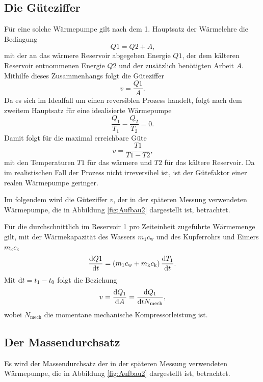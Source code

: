 \subsection{Die Güteziffer}
Für eine solche Wärmepumpe gilt nach dem 1. Hauptsatz der Wärmelehre die Bedingung
\begin{equation}
Q1 = Q2 + A\label{eq:Q1}\text{,}
\end{equation}
mit der an das wärmere Reservoir abgegeben Energie $Q1$, der dem kälteren
Reservoir entnommenen Energie $Q2$ und der zusätzlich benötigten Arbeit $A$.
Mithilfe dieses Zusammenhangs folgt die Güteziffer
\begin{equation}
v = \frac{Q1}{A}\label{eq:v1}\text{.}
\end{equation}
Da es sich im Idealfall um einen reversiblen Prozess handelt, folgt nach dem zweitem Hauptsatz für eine idealisierte Wärmepumpe
\begin{equation}
\frac{Q_1}{T_1}-\frac{Q_2}{T_2}=0\label{eq:redQ}\text{.}
\end{equation}
Damit folgt für die maximal erreichbare Güte
\begin{equation}
v = \frac{T1}{T1-T2}\label{eq:vid}\text{,}
\end{equation}
mit den Temperaturen $T1$ für das wärmere und $T2$ für das kältere Reservoir.
Da im realistischen Fall der Prozess nicht irreversibel ist, ist der Gütefaktor einer realen Wärmepumpe geringer.

Im folgendem wird die Güteziffer $v$, der in der späteren Messung verwendeten Wärmepumpe, die in Abbildung \ref{fig:Aufbau2} dargestellt ist, betrachtet. 

Für die durchschnittlich im Reservoir 1 pro Zeiteinheit zugeführte Wärmemenge gilt, mit der Wärmekapazität des Wassers $m_1c_\text{w}$ und des Kupferrohrs und Eimers $m_\text{k}c_\text{k}$
\begin{equation}
  \frac{\mathop{}\!\mathrm{d} Q1}{\mathop{}\!\mathrm{d} t} = \left( m_1c_\text{w} + m_\text{k}c_\text{k}\right) \frac{\mathop{}\!\mathrm{d} T_1}{\mathop{}\!\mathrm{d} t}\text{.}\label{eq:T1Q1}
\end{equation}
Mit $\mathop{}\!\mathrm{d} t= t_1 -t_0$ folgt die Beziehung
\begin{equation}
	v = \frac{\mathop{}\!\mathrm{d} Q_1}{\mathop{}\!\mathrm{d} A} = \frac{\mathop{}\!\mathrm{d} Q_1}{\mathop{}\!\mathrm{d} t N_\text{mech}}\text{,}\label{eq:v}
\end{equation}
wobei $N_\text{mech}$ die momentane mechanische Kompressorleistung ist.

\subsection{Der Massendurchsatz}
Es wird der Massendurchsatz der in der späteren Messung verwendeten Wärmepumpe, die in Abbildung \ref{fig:Aufbau2} dargestellt ist, betrachtet.

